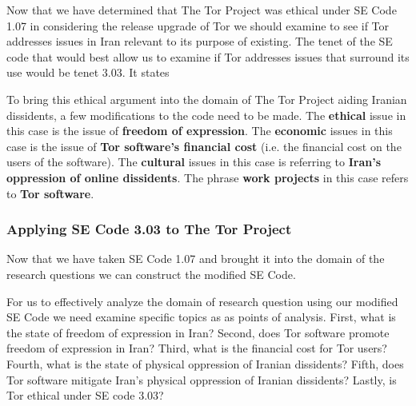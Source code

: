 \documentclass[11pt]{article}
\begin{document}
\begin{multicols}{2}
Now that we have determined that The Tor Project was ethical under SE Code 1.07
in considering the release upgrade of Tor we should examine to see if Tor
addresses issues in Iran relevant to its purpose of existing. The tenet of the
SE code that would best allow us to examine if Tor addresses issues that
surround its use would be tenet 3.03.  It states
\newline
\begin{center}
\end{center}
\smallskip
To bring this ethical argument into the domain of The Tor Project aiding Iranian
dissidents, a few modifications to the code need to be made. The
\textbf{ethical} issue in this case is the issue of \textbf{freedom of
expression}. The \textbf{economic} issues in this case is the issue of
\textbf{Tor software's financial cost} (i.e. the financial cost on the users of
the software). The \textbf{cultural} issues in this case is referring to
\textbf{Iran's oppression of online dissidents}. The phrase \textbf{work
projects} in this case refers to \textbf{Tor software}.

\subsubsection{Applying SE Code 3.03 to The Tor Project}

Now that we have taken SE Code 1.07 and brought it into the domain of the
research questions we can construct the modified SE Code.
\newline
\begin{center}
\end{center}
\smallskip
For us to effectively analyze the domain of research question using our modified
SE Code we need examine specific topics as as points of analysis.  First, what
is the state of freedom of expression in Iran? Second, does Tor software
promote freedom of expression in Iran? Third, what is the financial cost for
Tor users?  Fourth, what is the state of physical oppression of Iranian
dissidents? Fifth, does Tor software mitigate Iran's physical oppression of
Iranian dissidents?
Lastly, is Tor ethical under SE code 3.03?


\end{multicols}
\end{document}
